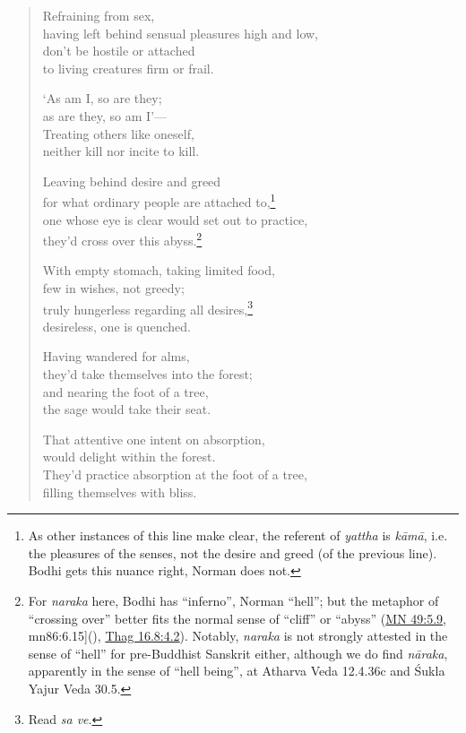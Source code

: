 \documentclass[12pt,openany]{book}%
\begin{document}
\begin{verse}
Refraining from sex, \\
having left behind sensual pleasures high and low, \\
don’t be hostile or attached \\
to living creatures firm or frail. 

‘As am I, so are they; \\
as are they, so am I’—\\
Treating others like oneself, \\
neither kill nor incite to kill. 

Leaving behind desire and greed \\
for what ordinary people are attached to,\footnote{As other instances of this line make clear, the referent of \textit{yattha} is \textit{\textsanskrit{kāmā}}, i.e. the pleasures of the senses, not the desire and greed (of the previous line). Bodhi gets this nuance right, Norman does not. } \\
one whose eye is clear would set out to practice, \\
they’d cross over this abyss.\footnote{For \textit{naraka} here, Bodhi has “inferno”, Norman “hell”; but the metaphor of “crossing over” better fits the normal sense of “cliff” or “abyss” (\href{https://suttacentral.net/mn49/en/sujato\#5.9}{MN 49:5.9}, mn86:6.15](), \href{https://suttacentral.net/thag16.8/en/sujato\#4.2}{Thag 16.8:4.2}). Notably, \textit{naraka} is not strongly attested in the sense of “hell” for pre-Buddhist Sanskrit either, although we do find \textit{\textsanskrit{nāraka}}, apparently in the sense of “hell being”, at Atharva Veda 12.4.36c and Śukla Yajur Veda 30.5. } 

With empty stomach, taking limited food, \\
few in wishes, not greedy; \\
truly hungerless regarding all desires,\footnote{Read \textit{sa ve}. } \\
desireless, one is quenched. 

Having wandered for alms, \\
they’d take themselves into the forest; \\
and nearing the foot of a tree, \\
the sage would take their seat. 

That attentive one intent on absorption, \\
would delight within the forest. \\
They’d practice absorption at the foot of a tree, \\
filling themselves with bliss. 


\end{verse}
\end{document}
